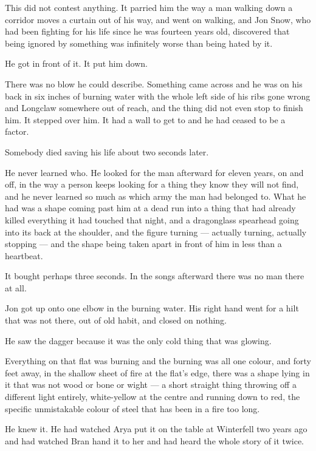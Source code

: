 This did not contest anything. It parried him the way a man walking down a corridor moves a curtain out of his way, and went on walking, and Jon Snow, who had been fighting for his life since he was fourteen years old, discovered that being ignored by something was infinitely worse than being hated by it.

He got in front of it. It put him down.

There was no blow he could describe. Something came across and he was on his back in six inches of burning water with the whole left side of his ribs gone wrong and Longclaw somewhere out of reach, and the thing did not even stop to finish him. It stepped over him. It had a wall to get to and he had ceased to be a factor.

\sceneBreak

Somebody died saving his life about two seconds later.

He never learned who. He looked for the man afterward for eleven years, on and off, in the way a person keeps looking for a thing they know they will not find, and he never learned so much as which army the man had belonged to. What he had was a shape coming past him at a dead run into a thing that had already killed everything it had touched that night, and a dragonglass spearhead going into its back at the shoulder, and the figure turning — actually turning, actually stopping — and the shape being taken apart in front of him in less than a heartbeat.

It bought perhaps three seconds. In the songs afterward there was no man there at all.

Jon got up onto one elbow in the burning water. His right hand went for a hilt that was not there, out of old habit, and closed on nothing.

\sceneBreak

He saw the dagger because it was the only cold thing that was glowing.

Everything on that flat was burning and the burning was all one colour, and forty feet away, in the shallow sheet of fire at the flat’s edge, there was a shape lying in it that was not wood or bone or wight — a short straight thing throwing off a different light entirely, white-yellow at the centre and running down to red, the specific unmistakable colour of steel that has been in a fire too long.

He knew it. He had watched Arya put it on the table at Winterfell two years ago and had watched Bran hand it to her and had heard the whole story of it twice.

